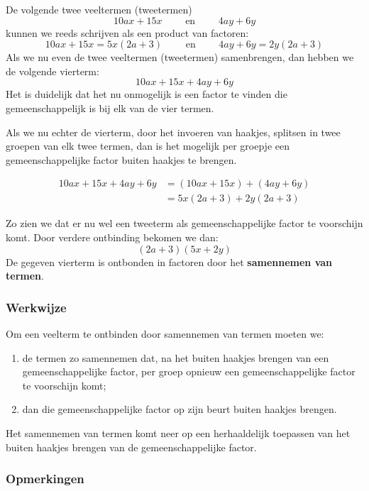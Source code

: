 \documentclass[12pt]{article}
\begin{document}
De volgende twee veeltermen (tweetermen)
$$10ax + 15x	\qquad\mbox{ en }\qquad	4ay + 6y$$
kunnen we reeds schrijven als een product van factoren:
$$10ax + 15x = 5x (2a + 3)	\qquad\mbox{ en }\qquad 4ay + 6y = 2y (2a + 3)$$
Als we nu even de twee veeltermen (tweetermen) samenbrengen, dan hebben we de volgende vierterm:
$$10ax + 15x + 4ay + 6y$$
Het is duidelijk dat het nu onmogelijk is een factor te vinden die gemeenschappelijk is bij elk van de vier termen.

Als we nu echter de vierterm, door het invoeren van haakjes, splitsen in twee groepen van elk twee termen, dan is het mogelijk per groepje een gemeenschappelijke factor buiten haakjes te brengen.

\begin{align*}
10ax + 15x + 4ay + 6y	&= (10ax + 15x) + (4ay + 6y)\\
                      &= 5x (2a + 3) + 2y (2a + 3)
\end{align*}

Zo zien we dat er nu wel een tweeterm als gemeenschappelijke factor te voorschijn komt.
Door verdere ontbinding bekomen we dan:
$$(2a + 3) (5x + 2y)$$
De gegeven vierterm is ontbonden in factoren door het {\bf samennemen van termen}.

\subsubsection*{Werkwijze}

Om een veelterm te ontbinden door samennemen van termen moeten we:
\begin{enumerate}
  \item de termen zo samennemen dat, na het buiten haakjes brengen van een gemeenschappelijke factor, per groep opnieuw een gemeenschappelijke factor te voorschijn komt;
  \item dan die gemeenschappelijke factor op zijn beurt buiten haakjes brengen.
\end{enumerate}

Het samennemen van termen komt neer op een herhaaldelijk toepassen van het buiten haakjes brengen van de gemeenschappelijke factor.

\subsubsection*{Opmerkingen}
\end{document}
